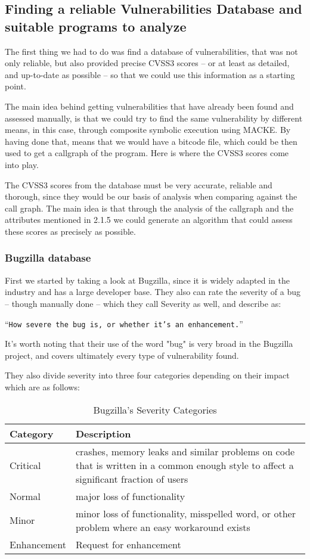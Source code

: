 \subsection{Finding a reliable Vulnerabilities Database and suitable programs to analyze}

The first thing we had to do was find a database of vulnerabilities, that was not only reliable, but also provided precise CVSS3 scores -- or at least as detailed, and up-to-date as possible -- so that we could use this information as a starting point.

The main idea behind getting vulnerabilities that have already been found and assessed manually, is that we could try to find the same vulnerability by different means, in this case, through composite symbolic execution using MACKE. By having done that, means that we would have a bitcode file, which could be then used to get a callgraph of the program. Here is where the CVSS3 scores come into play.

The CVSS3 scores from the database must be very accurate, reliable and thorough, since they would be our basis of analysis when comparing against the call graph. The main idea is that through the analysis of the callgraph and the attributes mentioned in 2.1.5 we could generate an algorithm that could assess these scores as precisely as possible.

\subsubsection{Bugzilla database}
First we started by taking a look at Bugzilla\parencite{bugzilla}, since it is widely adapted in the industry and has a large developer base. They also can rate the severity of a bug -- though manually done -- which they call Severity as well, and describe as:

\enquote{\texttt{How severe the bug is, or whether it's an enhancement.}}\parencite{bugzilla}

It's worth noting that their use of the word "bug" is very broad in the Bugzilla project, and covers ultimately every type of vulnerability found. 

They also divide severity into three four categories depending on their impact which are as follows:

\begin{table}[!htb]
	\centering
	\caption{Bugzilla's Severity Categories}
\begin{tabular}{ |p{4cm}||p{9cm}|  }
	\hline
	Category & Description\\
	\hline
	Critical   & crashes, memory leaks and similar problems on code that is written in a common enough style to affect a significant fraction of users   \\
	Normal &   major loss of functionality \\
	Minor & minor loss of functionality, misspelled word, or other problem where an easy workaround exists \\
	Enhancement    & Request for enhancement \\
	\hline
\end{tabular}
\end{table}

